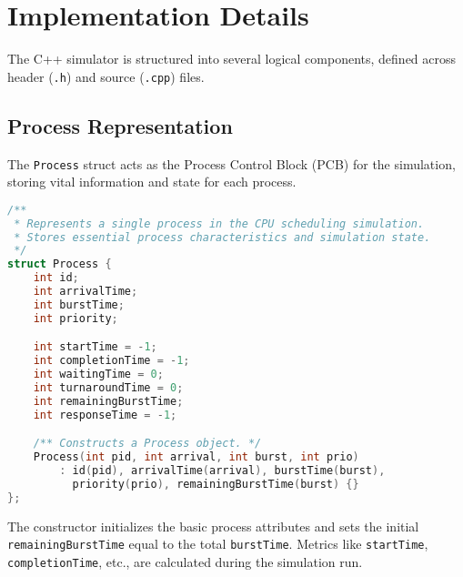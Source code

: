 \documentclass[12pt]{article}
\begin{document}
\section{Implementation Details}
The C++ simulator is structured into several logical components, defined across header (\texttt{.h}) and source (\texttt{.cpp}) files.

\subsection{Process Representation }
The \texttt{Process} struct acts as the Process Control Block (PCB) for the simulation, storing vital information and state for each process.
\begin{lstlisting}[language=C++, caption={Process Struct Definition (Process.h)}, label={lst:process_struct}, style=cppstyle]
/**
 * Represents a single process in the CPU scheduling simulation.
 * Stores essential process characteristics and simulation state.
 */
struct Process {
    int id;
    int arrivalTime;
    int burstTime;
    int priority;

    int startTime = -1;
    int completionTime = -1;
    int waitingTime = 0;
    int turnaroundTime = 0;
    int remainingBurstTime;
    int responseTime = -1;

    /** Constructs a Process object. */
    Process(int pid, int arrival, int burst, int prio)
        : id(pid), arrivalTime(arrival), burstTime(burst), 
          priority(prio), remainingBurstTime(burst) {}
};
\end{lstlisting}
The constructor initializes the basic process attributes and sets the initial \texttt{remainingBurstTime} equal to the total \texttt{burstTime}. Metrics like \texttt{startTime}, \texttt{completionTime}, etc., are calculated during the simulation run.
\end{document}
